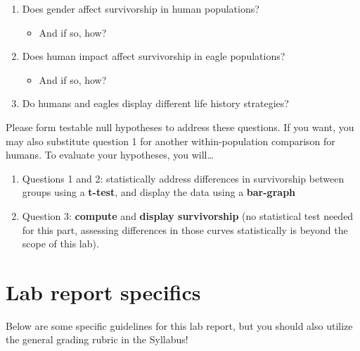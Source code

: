 \documentclass[11pt,]{article}
\providecommand{\tightlist}{%
\setlength{\itemsep}{0pt}\setlength{\parskip}{0pt}}
\begin{document}
\begin{enumerate}
\def\labelenumi{\arabic{enumi}.}
\tightlist
\item
  Does gender affect survivorship in human populations?

  \begin{itemize}
  \tightlist
  \item
    And if so, how?
  \end{itemize}
\item
  Does human impact affect survivorship in eagle populations?

  \begin{itemize}
  \tightlist
  \item
    And if so, how?
  \end{itemize}
\item
  Do humans and eagles display different life history strategies?
\end{enumerate}

Please form testable null hypotheses to address these questions. If you
want, you may also substitute question 1 for another within-population
comparison for humans. To evaluate your hypotheses, you will\ldots{}

\begin{enumerate}
\def\labelenumi{\arabic{enumi}.}
\tightlist
\item
  Questions 1 and 2: statistically address differences in survivorship
  between groups using a \textbf{t-test}, and display the data using a
  \textbf{bar-graph}
\item
  Question 3: \textbf{compute} and \textbf{display survivorship} (no
  statistical test needed for this part, assessing differences in those
  curves statistically is beyond the scope of this lab).
\end{enumerate}

\pagebreak

\hypertarget{lab-report-specifics}{%
\section{Lab report specifics}\label{lab-report-specifics}}

Below are some specific guidelines for this lab report, but you should
also utilize the general grading rubric in the Syllabus!
\end{document}
